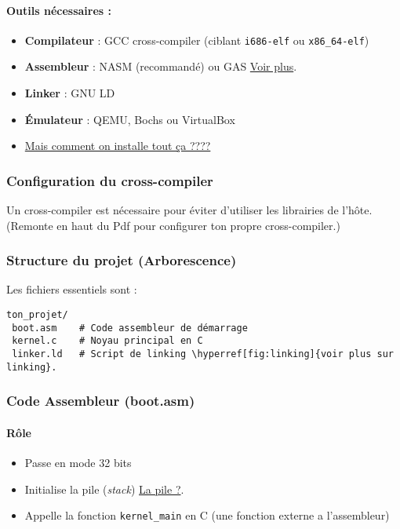 \documentclass{article}
\begin{document}
\paragraph{Outils nécessaires :}
\begin{itemize}
    \item \textbf{Compilateur} : GCC cross-compiler (ciblant \texttt{i686-elf} ou \texttt{x86\_64-elf})
    \item \textbf{Assembleur} : NASM  (recommandé) ou GAS   \hyperref[fig:nasm]{Voir plus}.

    \item \textbf{Linker} : GNU LD
    \item \textbf{Émulateur} : QEMU, Bochs ou VirtualBox
    \item \hyperref[fig:tutoinstalltt]{Mais comment on installe tout ça ????}
\end{itemize}

\subsubsection*{Configuration du cross-compiler}
Un cross-compiler est nécessaire pour éviter d'utiliser les librairies de l'hôte.\\
    (Remonte en haut du Pdf pour configurer ton propre cross-compiler.)

\subsubsection*{Structure du projet (Arborescence)}
Les fichiers essentiels sont :

\begin{verbatim}
ton_projet/
 boot.asm    # Code assembleur de démarrage
 kernel.c    # Noyau principal en C
 linker.ld   # Script de linking \hyperref[fig:linking]{voir plus sur linking}.
\end{verbatim}

\subsubsection*{Code Assembleur (boot.asm)}
\paragraph{Rôle}
\begin{itemize}
    \item Passe en mode 32 bits
    \item Initialise la pile (\textit{stack}) \hyperref[fig:pilenasm]{La pile ?}.
    \item Appelle la fonction \texttt{kernel\_main} en C (une fonction externe a l'assembleur)
\end{itemize}
\newpage
\end{document}
